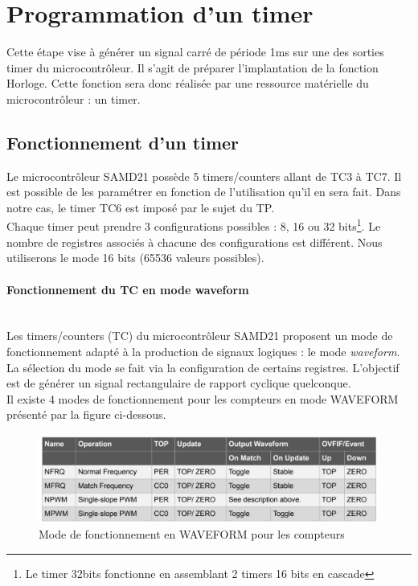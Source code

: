 \documentclass[a4paper]{article}
\begin{document}
	\newpage
	\section{Programmation d'un timer}
	Cette étape vise à générer un signal carré de période 1ms sur une des sorties timer du microcontrôleur. Il s'agit  de préparer l'implantation de la fonction Horloge. Cette fonction sera donc réalisée par une ressource matérielle du microcontrôleur : un timer.
	\subsection{Fonctionnement d'un timer}
	Le microcontrôleur SAMD21 possède 5 timers/counters allant de TC3 à TC7. Il est possible de les paramétrer en fonction de l’utilisation qu’il en sera fait. Dans notre cas, le timer TC6 est imposé par le sujet du TP.\\
	Chaque timer peut prendre 3 configurations possibles : 8, 16 ou 32 bits\footnote{Le timer 32bits fonctionne en assemblant 2 timers 16 bits en cascade}. Le nombre de registres associés à chacune des configurations est différent. Nous utiliserons le mode 16 bits (65536 valeurs possibles).  \\
	\paragraph{Fonctionnement du TC en mode waveform}
	~~\\
	Les timers/counters (TC) du microcontrôleur SAMD21 proposent un mode de fonctionnement adapté à la production de signaux logiques : le mode {\sl waveform}. La sélection du mode se fait via la configuration de certains registres. L'objectif est de générer un signal rectangulaire de rapport cyclique quelconque. \\
	Il existe 4 modes de fonctionnement pour les compteurs en mode WAVEFORM présenté par la figure ci-dessous. \\
	
	\begin{figure}[H]
		\centering
		\includegraphics[width=0.9\linewidth]{mode Waveform.jpg}
		\caption{Mode de fonctionnement en WAVEFORM pour les compteurs}
	\end{figure}
	
\end{document}
